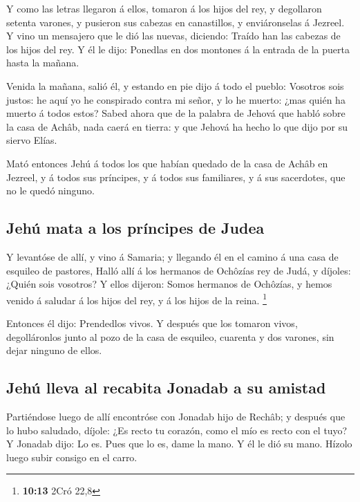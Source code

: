  Y como las letras llegaron á ellos, tomaron á los hijos
del rey, y degollaron setenta varones, y pusieron sus cabezas en
canastillos, y enviáronselas á Jezreel.  Y vino un
mensajero que le dió las nuevas, diciendo: Traído han las cabezas de los
hijos del rey. Y él le dijo: Ponedlas en dos montones á la entrada de la
puerta hasta la mañana.

 Venida la mañana, salió él, y estando en pie dijo á todo
el pueblo: Vosotros sois justos: he aquí yo he conspirado contra mi
señor, y lo he muerto: ¿mas quién ha muerto á todos estos?
 Sabed ahora que de la palabra de Jehová que habló sobre
la casa de Achâb, nada caerá en tierra: y que Jehová ha hecho lo que
dijo por su siervo Elías.

 Mató entonces Jehú á todos los que habían quedado de la
casa de Achâb en Jezreel, y á todos sus príncipes, y á todos sus
familiares, y á sus sacerdotes, que no le quedó ninguno.

\hypertarget{jehuxfa-mata-a-los-pruxedncipes-de-judea}{%
\subsection{Jehú mata a los príncipes de
Judea}\label{jehuxfa-mata-a-los-pruxedncipes-de-judea}}

 Y levantóse de allí, y vino á Samaria; y llegando él en
el camino á una casa de esquileo de pastores,  Halló allí
á los hermanos de Ochôzías rey de Judá, y díjoles: ¿Quién sois vosotros?
Y ellos dijeron: Somos hermanos de Ochôzías, y hemos venido á saludar á
los hijos del rey, y á los hijos de la reina. \footnote{\textbf{10:13}
  2Cró 22,8}

 Entonces él dijo: Prendedlos vivos. Y después que los
tomaron vivos, degolláronlos junto al pozo de la casa de esquileo,
cuarenta y dos varones, sin dejar ninguno de ellos.

\hypertarget{jehuxfa-lleva-al-recabita-jonadab-a-su-amistad}{%
\subsection{Jehú lleva al recabita Jonadab a su
amistad}\label{jehuxfa-lleva-al-recabita-jonadab-a-su-amistad}}

 Partiéndose luego de allí encontróse con Jonadab hijo de
Rechâb; y después que lo hubo saludado, díjole: ¿Es recto tu corazón,
como el mío es recto con el tuyo? Y Jonadab dijo: Lo es. Pues que lo es,
dame la mano. Y él le dió su mano. Hízolo luego subir consigo en el
carro.

